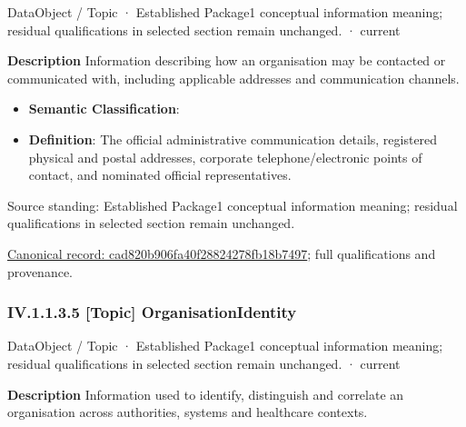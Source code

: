 \label{element:cad820b906fa40f28824278fb18b7497}
{\small DataObject / Topic · Established Package1 conceptual information meaning; residual qualifications in selected section remain unchanged. · current}\par

\textbf{Description}
Information describing how an organisation may be contacted or communicated with, including applicable addresses and communication channels.



\begin{itemize}


\item \textbf{Semantic Classification}: \texttt{}

\item \textbf{Definition}: The official administrative communication details, registered physical and postal addresses, corporate telephone/electronic points of contact, and nominated official representatives.

\end{itemize}


Source standing: Established Package1 conceptual information meaning; residual qualifications in selected section remain unchanged.


{\footnotesize \href{../../../../../../../continuum/application/data-object/topic/cad820b906fa40f28824278fb18b7497.md}{Canonical record: cad820b906fa40f28824278fb18b7497}; full qualifications and provenance.}\par
\subsubsection*{IV.1.1.3.5 [Topic] OrganisationIdentity}
\label{navigation:IV.1.1.3.5}

\label{element:c240be16de76415682237a238b3d3fc8}
{\small DataObject / Topic · Established Package1 conceptual information meaning; residual qualifications in selected section remain unchanged. · current}\par

\textbf{Description}
Information used to identify, distinguish and correlate an organisation across authorities, systems and healthcare contexts.



